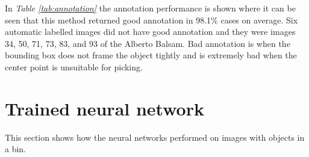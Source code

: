 \begin{table}[h]
\caption{Annotation on the automatically generated dataset with one object in the bin.}
\label{tab:annotation}
\end{table}

In \textit{Table \ref{tab:annotation}} the annotation performance is shown where it can be seen that this method returned good annotation in 98.1\% cases on average. Six automatic labelled images did not have good annotation and they were images 34, 50, 71, 73, 83, and 93 of the Alberto Balsam. Bad annotation is when the bounding box does not frame the object tightly and is extremely bad when the center point is unsuitable for picking.



\clearpage
\section{Trained neural network}\label{sec:resneural}
This section shows how the neural networks performed on images with objects in a bin.

